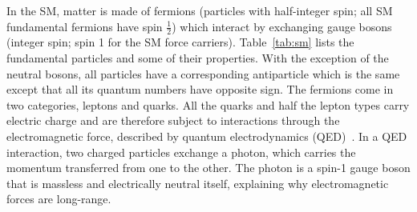 In the SM, matter is made of fermions (particles with half-integer spin; all SM fundamental fermions have spin $\frac{1}{2}$) which interact by exchanging gauge bosons (integer spin; spin 1 for the SM force carriers).
Table~\ref{tab:sm} lists the fundamental particles and some of their properties.
With the exception of the neutral bosons, all particles have a corresponding antiparticle which is the same except that all its quantum numbers have opposite sign.
The fermions come in two categories, leptons and quarks.
All the quarks and half the lepton types carry electric charge and are therefore subject to interactions through the electromagnetic force, described by quantum electrodynamics (QED)~\cite{Halzen:1984mc}.
In a QED interaction, two charged particles exchange a photon, which carries the momentum transferred from one to the other.
The photon is a spin-1 gauge boson that is massless and electrically neutral itself, explaining why electromagnetic forces are long-range.

